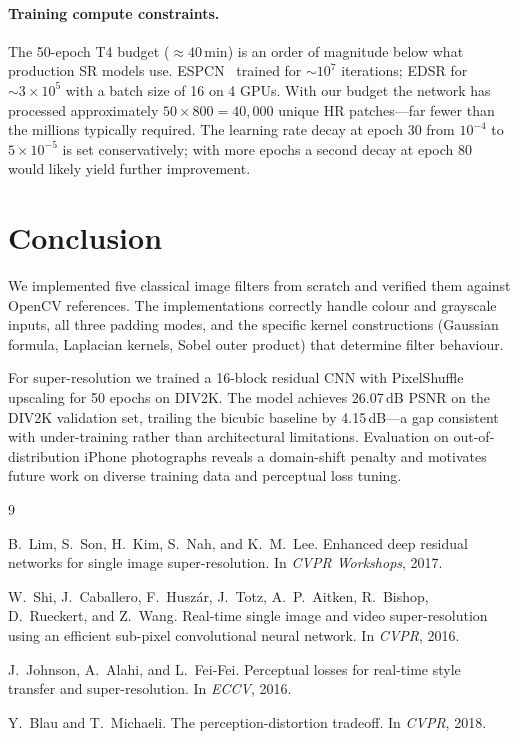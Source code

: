 \documentclass{article}
\begin{document}
\paragraph{Training compute constraints.}
The 50-epoch T4 budget ($\approx 40$\,min) is an order of magnitude below what
production SR models use.
ESPCN~\cite{shi2016real} trained for $\sim 10^7$ iterations; EDSR for
$\sim 3 \times 10^5$ with a batch size of 16 on 4 GPUs.
With our budget the network has processed approximately $50 \times 800 = 40{,}000$
unique HR patches---far fewer than the millions typically required.
The learning rate decay at epoch 30 from $10^{-4}$ to $5 \times 10^{-5}$ is
set conservatively; with more epochs a second decay at epoch 80 would likely
yield further improvement.

\section{Conclusion}

We implemented five classical image filters from scratch and verified them
against OpenCV references.
The implementations correctly handle colour and grayscale inputs, all three
padding modes, and the specific kernel constructions (Gaussian formula,
Laplacian kernels, Sobel outer product) that determine filter behaviour.

For super-resolution we trained a 16-block residual CNN with PixelShuffle
upscaling for 50 epochs on DIV2K.
The model achieves 26.07\,dB PSNR on the DIV2K validation set, trailing the
bicubic baseline by 4.15\,dB---a gap consistent with under-training rather
than architectural limitations.
Evaluation on out-of-distribution iPhone photographs reveals a domain-shift
penalty and motivates future work on diverse training data and perceptual loss
tuning.


\begin{thebibliography}{9}

B.~Lim, S.~Son, H.~Kim, S.~Nah, and K.~M.~Lee.
\newblock Enhanced deep residual networks for single image super-resolution.
\newblock In \emph{CVPR Workshops}, 2017.

W.~Shi, J.~Caballero, F.~Husz{\'a}r, J.~Totz, A.~P.~Aitken, R.~Bishop,
D.~Rueckert, and Z.~Wang.
\newblock Real-time single image and video super-resolution using an efficient
sub-pixel convolutional neural network.
\newblock In \emph{CVPR}, 2016.

J.~Johnson, A.~Alahi, and L.~Fei-Fei.
\newblock Perceptual losses for real-time style transfer and super-resolution.
\newblock In \emph{ECCV}, 2016.

Y.~Blau and T.~Michaeli.
\newblock The perception-distortion tradeoff.
\newblock In \emph{CVPR}, 2018.

\end{thebibliography}
\end{document}
